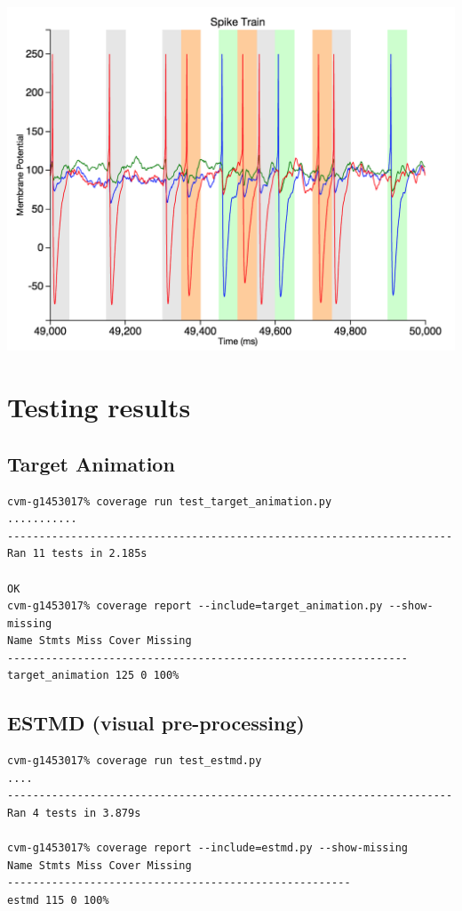 \documentclass[a4paper,11pt]{article}
\begin{document}
\begin{appendices}
\includegraphics{multiple_end}
\section{Testing results}
\subsection{Target Animation}
\begin{verbatim}
cvm-g1453017% coverage run test_target_animation.py
...........
----------------------------------------------------------------------
Ran 11 tests in 2.185s

OK
cvm-g1453017% coverage report --include=target_animation.py --show-missing
Name Stmts Miss Cover Missing
---------------------------------------------------------------
target_animation 125 0 100%
\end{verbatim}
\subsection{ESTMD (visual pre-processing)}
\begin{verbatim}
cvm-g1453017% coverage run test_estmd.py
....
----------------------------------------------------------------------
Ran 4 tests in 3.879s

cvm-g1453017% coverage report --include=estmd.py --show-missing
Name Stmts Miss Cover Missing
------------------------------------------------------
estmd 115 0 100% 
\end{verbatim}
\end{appendices}
\end{document}
